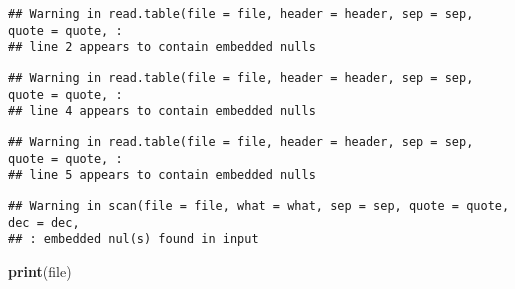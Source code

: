 \documentclass[
]{article}
\newenvironment{Shaded}{\begin{snugshade}}{\end{snugshade}}
\newcommand{\FunctionTok}[1]{\textcolor[rgb]{0.13,0.29,0.53}{\textbf{#1}}}
\newcommand{\NormalTok}[1]{#1}
\begin{document}
\begin{verbatim}
## Warning in read.table(file = file, header = header, sep = sep, quote = quote, :
## line 2 appears to contain embedded nulls
\end{verbatim}

\begin{verbatim}
## Warning in read.table(file = file, header = header, sep = sep, quote = quote, :
## line 4 appears to contain embedded nulls
\end{verbatim}

\begin{verbatim}
## Warning in read.table(file = file, header = header, sep = sep, quote = quote, :
## line 5 appears to contain embedded nulls
\end{verbatim}

\begin{verbatim}
## Warning in scan(file = file, what = what, sep = sep, quote = quote, dec = dec,
## : embedded nul(s) found in input
\end{verbatim}

\begin{Shaded}
\begin{Highlighting}[]
\FunctionTok{print}\NormalTok{(file)}
\end{Highlighting}
\end{Shaded}
\end{document}
